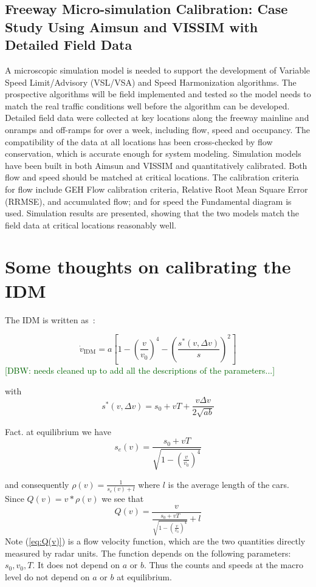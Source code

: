 \documentclass{article}
\newcommand{\kibitz}[2]{\ifnum\Comments=0\textcolor{#1}{#2}\fi}
\newcommand{\Dan}[1]{\kibitz{darkgreen}      {[DBW: #1]}}
\begin{document}
\subsection*{Freeway Micro-simulation Calibration: Case Study Using Aimsun and VISSIM with Detailed Field Data \cite{freeCalib}}
A microscopic simulation model is needed to support the development of Variable Speed Limit/Advisory (VSL/VSA) and Speed Harmonization algorithms. The prospective algorithms will be field implemented and tested so the model needs to match the real traffic conditions well before the algorithm can be developed. Detailed field data were collected at key locations along the freeway mainline and onramps and off-ramps for over a week, including flow, speed and occupancy. The compatibility of the data at all locations has been cross-checked by flow conservation, which is accurate enough for system modeling. Simulation models have been built in both Aimsun and VISSIM and quantitatively calibrated. Both flow and speed should be matched at critical locations. The calibration criteria for flow include GEH Flow calibration criteria, Relative Root Mean Square Error (RRMSE), and accumulated flow; and for speed the Fundamental diagram is used. Simulation results are presented, showing that the two models match the field data at critical locations reasonably well. 


\section{Some thoughts on calibrating the IDM}
The IDM is written as~\cite{treiber}:

\begin{equation}
    \dot{v}_{\text{IDM}}=a\left[1-\left(\frac{v}{v_{0}}\right)^{4}-\left(\frac{s^{*}\left(v,\Delta v\right)}{s}\right)^{2}\right]
\end{equation}
\Dan{needs cleaned up to add all the descriptions of the parameters...}

with 
\begin{equation}
    s^{*}\left(v,\Delta v\right)=s_{0}+vT+\frac{v\Delta v}{2\sqrt{ab}}
\end{equation}


Fact. at equilibrium we have 
\begin{equation}
 s_{e}\left(v\right)=\frac{s_{0}+vT}{\sqrt{1-\left(\frac{v}{v_{0}}\right)^{4}}}   
\end{equation}


and consequently $\rho(v)=\frac{1}{s_{e}(v)+l}$ where $l$ is the
average length of the cars. Since $Q(v)=v*\rho(v)$ we see that 
\begin{equation}
Q(v)=\frac{v}{\frac{s_{0}+vT}{\sqrt{1-\left(\frac{v}{v_{0}}\right)^{4}}}+l}\label{eq:Q(v)}
\end{equation}
 Note (\ref{eq:Q(v)}) is a flow velocity function, which are the
two quantities directly measured by radar units. The function depends
on the following parameters: $s_{0},v_{0},T.$ It does not depend
on $a$ or $b.$ Thus the counts and speeds at the macro level do
not depend on $a$ or $b$ at equilibrium. 
\end{document}
